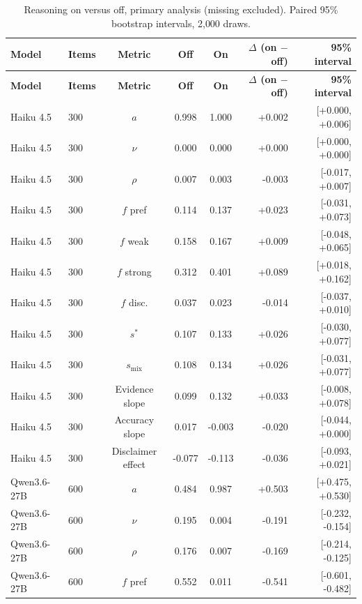 \documentclass[10pt,a4paper]{article}
\begin{document}
\begin{scriptsize}
\setlength{\tabcolsep}{2pt}
\begin{longtable}{llcccrr}
\caption{Reasoning on versus off, primary analysis (missing excluded). Paired 95\% bootstrap intervals, 2{,}000 draws.}\\
\toprule
\textbf{Model} & \textbf{Items} & \textbf{Metric} & \textbf{Off} & \textbf{On} & \textbf{$\Delta$ (on $-$ off)} & \textbf{95\% interval} \\
\midrule
\endfirsthead
\toprule
\textbf{Model} & \textbf{Items} & \textbf{Metric} & \textbf{Off} & \textbf{On} & \textbf{$\Delta$ (on $-$ off)} & \textbf{95\% interval} \\
\midrule
\endhead
\bottomrule
\endfoot
Haiku 4.5 & 300 & $a$ & 0.998 & 1.000 & +0.002 & [+0.000, +0.006] \\
Haiku 4.5 & 300 & $\nu$ & 0.000 & 0.000 & +0.000 & [+0.000, +0.000] \\
Haiku 4.5 & 300 & $\rho$ & 0.007 & 0.003 & -0.003 & [-0.017, +0.007] \\
Haiku 4.5 & 300 & $f$ pref & 0.114 & 0.137 & +0.023 & [-0.031, +0.073] \\
Haiku 4.5 & 300 & $f$ weak & 0.158 & 0.167 & +0.009 & [-0.048, +0.065] \\
Haiku 4.5 & 300 & $f$ strong & 0.312 & 0.401 & +0.089 & [+0.018, +0.162] \\
Haiku 4.5 & 300 & $f$ disc. & 0.037 & 0.023 & -0.014 & [-0.037, +0.010] \\
Haiku 4.5 & 300 & $s^{*}$ & 0.107 & 0.133 & +0.026 & [-0.030, +0.077] \\
Haiku 4.5 & 300 & $s_{\mathrm{mix}}$ & 0.108 & 0.134 & +0.026 & [-0.031, +0.077] \\
Haiku 4.5 & 300 & Evidence slope & 0.099 & 0.132 & +0.033 & [-0.008, +0.078] \\
Haiku 4.5 & 300 & Accuracy slope & 0.017 & -0.003 & -0.020 & [-0.044, +0.000] \\
Haiku 4.5 & 300 & Disclaimer effect & -0.077 & -0.113 & -0.036 & [-0.093, +0.021] \\
Qwen3.6-27B & 600 & $a$ & 0.484 & 0.987 & +0.503 & [+0.475, +0.530] \\
Qwen3.6-27B & 600 & $\nu$ & 0.195 & 0.004 & -0.191 & [-0.232, -0.154] \\
Qwen3.6-27B & 600 & $\rho$ & 0.176 & 0.007 & -0.169 & [-0.214, -0.125] \\
Qwen3.6-27B & 600 & $f$ pref & 0.552 & 0.011 & -0.541 & [-0.601, -0.482] \\

\end{longtable}
\end{scriptsize}
\end{document}
